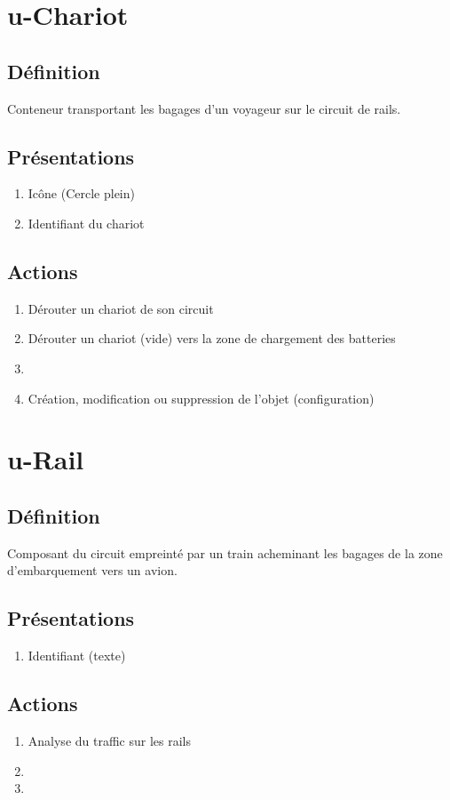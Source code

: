 \section{u-Chariot}
\subsection{Définition}
	Conteneur transportant les bagages d'un voyageur sur le circuit de rails.
\subsection{Présentations}
\begin{enumerate}
	\item Icône (Cercle plein)
	\item Identifiant du chariot
\end{enumerate}

\subsection{Actions}
\begin{enumerate}
	\item Dérouter un chariot de son circuit
	\item Dérouter un chariot (vide) vers la zone de chargement des batteries
	\item \etat
	\item Création, modification ou suppression de l'objet (configuration)
\end{enumerate}

\section{u-Rail}
\subsection{Définition}
	Composant du circuit empreinté par un train acheminant les bagages de la zone d'embarquement vers un avion.

\subsection{Présentations}
\begin{enumerate}
	\item Identifiant (texte)
\end{enumerate}

\subsection{Actions}
\begin{enumerate}
	\item Analyse du traffic sur les rails
	\item \etat 
	\item {}
\end{enumerate}

